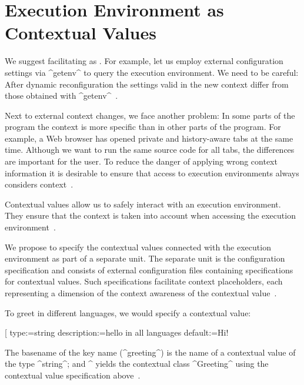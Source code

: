 \section{Execution Environment as Contextual Values}
\label{sec:cop}

We suggest facilitating  as .
For example, let us employ external configuration settings via ^getenv^ to query the execution environment.
We need to be careful:
After dynamic reconfiguration the settings valid in the new context differ from those obtained with ^getenv^~\cite{raab2014program}.

Next to external context changes, we face another problem:
In some parts of the program the context is more specific than in other parts of the program.
For example, a Web browser has opened private and history-aware tabs at the same time.
Although we want to run the same source code for all tabs, the differences are  important for the user.
To reduce the danger of applying wrong context information it is desirable to ensure that access to execution environments always considers context~\cite{raab2014program}.

Contextual values allow us to safely interact with an execution environment.
They ensure that the context is taken into account when accessing the execution environment~\cite{raab2016persistent}.

We propose to specify the contextual values connected with the execution environment as part of a separate unit.
The separate unit is the configuration specification and consists of external configuration files containing specifications for contextual values.
Such specifications facilitate context placeholders, each representing a dimension of the context awareness of the contextual value~\cite{raab2014program}.

\begin{example}
\label{ex:greeting}
To greet in different languages, we would specify a contextual value:

\begin{code}
[%
  type:=string
  description:=hello in all languages
  default:=Hi!
\end{code}

The basename of the key name (^greeting^) is the name of a contextual value of the type ^string^; and ^%
 yields the contextual class ^Greeting^ using the contextual value specification above~\cite{raab2014program}.
\end{example}

